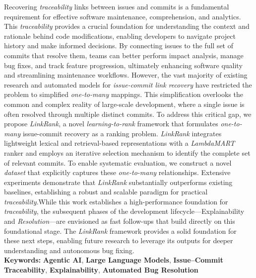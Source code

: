 Recovering \emph{traceability} links between issues and commits is a fundamental requirement for effective software maintenance, comprehension, and analytics. This \emph{traceability} provides a crucial foundation for understanding the context and rationale behind code modifications, enabling developers to navigate project history and make informed decisions. By connecting issues to the full set of commits that resolve them, teams can better perform impact analysis, manage bug fixes, and track feature progression, ultimately enhancing software quality and streamlining maintenance workflows. However, the vast majority of existing research and automated models for \emph{issue-commit link recovery} have restricted the problem to simplified \emph{one-to-many} mappings. This simplification overlooks the common and complex reality of large-scale development, where a single issue is often resolved through multiple distinct commits. To address this critical gap, we propose \emph{LinkRank}, a novel \emph{learning-to-rank} framework that formulates \emph{one-to-many} issue-commit recovery as a ranking problem. \emph{LinkRank} integrates lightweight lexical and retrieval-based representations with a \emph{LambdaMART} ranker and employs an iterative selection mechanism to identify the complete set of relevant commits. To enable systematic evaluation, we construct a novel \emph{dataset} that explicitly captures these \emph{one-to-many} relationships. Extensive experiments demonstrate that \emph{LinkRank} substantially outperforms existing baselines, establishing a robust and scalable paradigm for practical \emph{traceability}.While this work establishes a high-performance foundation for \emph{traceability}, the subsequent phases of the development lifecycle—{Explainability} and \emph{Resolution}—are envisioned as fast follow-ups that build directly on this foundational stage. The \emph{LinkRank} framework provides a solid foundation for these next steps, enabling future research to leverage its outputs for deeper understanding and autonomous bug fixing.\\

\textbf{Keywords:} \textbf{Agentic AI}, \textbf{Large Language Models}, \textbf{Issue–Commit Traceability}, \textbf{Explainability}, \textbf{Automated Bug Resolution}

\newpage

